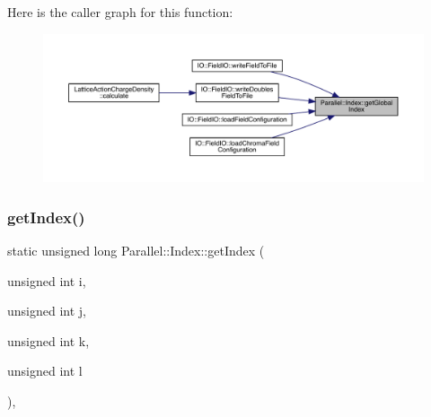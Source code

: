 Here is the caller graph for this function\+:
\nopagebreak
\begin{figure}[H]
\begin{center}
\leavevmode
\includegraphics[width=350pt]{class_parallel_1_1_index_aaa2650024b4e91dc86d2bdc568c8f57d_icgraph}
\end{center}
\end{figure}
\mbox{\label{class_parallel_1_1_index_af31faeef1369fdc0997d1910e008bfe2}} 
\subsubsection{\texorpdfstring{getIndex()}{getIndex()}}
{\footnotesize\ttfamily static unsigned long Parallel\+::\+Index\+::get\+Index (\begin{DoxyParamCaption}\item[{unsigned int}]{i,  }\item[{unsigned int}]{j,  }\item[{unsigned int}]{k,  }\item[{unsigned int}]{l }\end{DoxyParamCaption})\hspace{0.3cm}{\ttfamily [inline]}, {\ttfamily [static]}}

